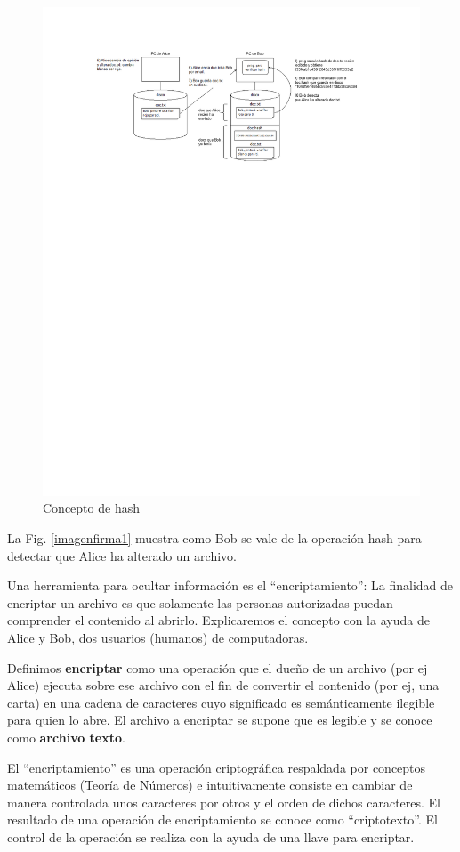 \documentclass[12pt]{report} %
\begin{document}
\begin{figure}
\centering
\includegraphics[width=0.85\columnwidth]{imagenes/gatorojo.pdf}
\caption{Concepto de hash}
\label{gatorojo}
\end{figure} 

La Fig. \ref{imagenfirma1}  muestra como Bob se vale de la operación hash para detectar que Alice ha alterado un archivo.

Una herramienta para ocultar información es el “encriptamiento”: La finalidad de encriptar un archivo es que solamente las personas autorizadas puedan comprender el contenido al abrirlo.  Explicaremos el concepto con la ayuda de Alice y Bob, dos usuarios (humanos) de computadoras.



Definimos \textbf{encriptar} como una operación que el dueño de un archivo (por ej Alice) ejecuta sobre ese archivo con el fin de convertir el contenido (por ej, una carta) en una cadena de caracteres cuyo significado es semánticamente ilegible para quien lo abre. El archivo a encriptar se supone que es legible y se conoce como \textbf{archivo texto}.




El “encriptamiento” es una operación criptográfica respaldada por conceptos matemáticos (Teoría de Números) e intuitivamente consiste en cambiar de manera controlada unos caracteres por otros y el orden de dichos caracteres. El resultado de una operación de encriptamiento se conoce como “criptotexto”. El control de la operación se realiza con la ayuda de una llave para encriptar.
\end{document}
